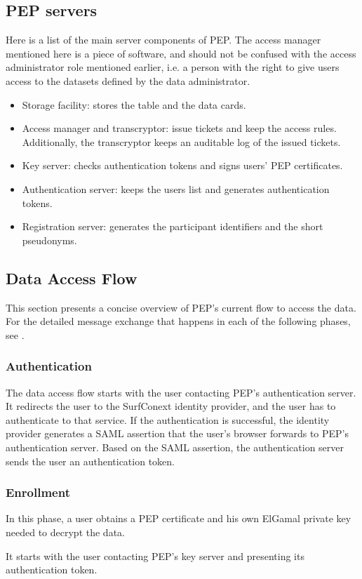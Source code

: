\documentclass{report}
\begin{document}
\subsection{PEP servers}\label{pep_servers}
Here is a list of the main server components of PEP. The access manager mentioned here is a piece of software, and should not be confused with the access administrator role mentioned
earlier, i.e. a person with the right to give users access to the datasets defined by the data administrator.
\begin{itemize}
		\item Storage facility: stores the table and the data cards.
		\item Access manager and transcryptor: issue tickets and keep the access rules. Additionally, the transcryptor keeps an auditable log of the issued tickets.
		\item Key server: checks authentication tokens and signs users' PEP certificates.
		\item Authentication server: keeps the users list and generates authentication tokens. 
		\item Registration server: generates the participant identifiers and the short pseudonyms.
\end{itemize}

\subsection{Data Access Flow}
This section presents a concise overview of PEP's current flow to access the data. For the detailed message exchange that happens in each of the following phases, see
\cite{pep-blueprint}.

\subsubsection{Authentication}
The data access flow starts with the user contacting PEP's authentication server. It redirects the user to the SurfConext identity provider, and the user has to authenticate to
that service. If the authentication is successful, the identity provider generates a SAML assertion that the user's browser forwards to PEP's authentication server. Based on the
SAML assertion, the authentication server sends the user an authentication token.


\subsubsection{Enrollment}
In this phase, a user obtains a PEP certificate and his own ElGamal private key needed to decrypt the data. \par
It starts with the user contacting PEP's key server and presenting its authentication token. 
\end{document}
